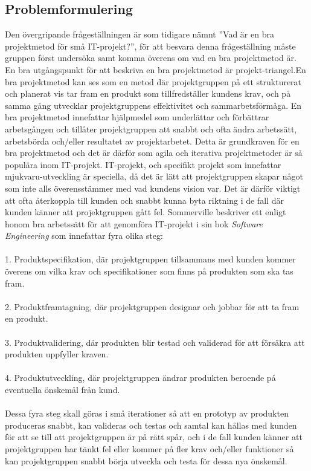 \documentclass[conference]{IEEEtran}
\begin{document}
\subsection{Problemformulering}
Den övergripande frågeställningen är som tidigare nämnt ''Vad är en bra projektmetod för små IT-projekt?'',  för att besvara denna frågeställning måste gruppen först undersöka samt komma överens om vad en bra projektmetod är. En bra utgångspunkt för att beskriva en bra projektmetod är projekt-triangel.En bra projektmetod kan ses som en metod där projektgruppen på ett strukturerat och planerat vis tar fram en produkt som tillfredställer kundens krav, och på samma gång utvecklar projektgruppens effektivitet och sammarbetsförmåga. En bra projektmetod innefattar hjälpmedel som underlättar och förbättrar arbetsgången och tillåter projektgruppen att snabbt och ofta ändra arbetssätt, arbetsbörda och/eller resultatet av projektarbetet. Detta är grundkraven för en bra projektmetod och det är därför som agila och iterativa projektmetoder är så populära inom IT-projekt. IT-projekt, och specifikt projekt som innefattar mjukvaru-utveckling är speciella, då det är lätt att projektgruppen skapar något som inte alls överensstämmer med vad kundens vision var. Det är därför viktigt att ofta återkoppla till kunden och snabbt kunna byta riktning i de fall där kunden känner att projektgruppen gått fel. Sommerville beskriver ett enligt honom bra arbetssätt för att genomföra IT-projekt i sin bok \textit{Software Engineering}\cite{Sommerville10} som innefattar fyra olika steg:\\
\\
1. Produktspecifikation, där projektgruppen tillsammans med kunden kommer överens om vilka krav och specifikationer som finns på produkten som ska tas fram.\\
\\
2. Produktframtagning, där projektgruppen designar och jobbar för att ta fram en produkt.\\
\\
3. Produktvalidering, där produkten blir testad och validerad för att försäkra att produkten uppfyller kraven.\\
\\
4. Produktutveckling, där projektgruppen ändrar produkten beroende på eventuella önskemål från kund.\\
\\
Dessa fyra steg skall göras i små iterationer så att en prototyp av produkten produceras snabbt, kan valideras och testas och samtal kan hållas med kunden för att se till att projektgruppen är på rätt spår, och i de fall kunden känner att projektgruppen har tänkt fel eller kommer på fler krav och/eller funktioner så kan projektgruppen snabbt börja utveckla och testa för dessa nya önskemål.
\end{document}
